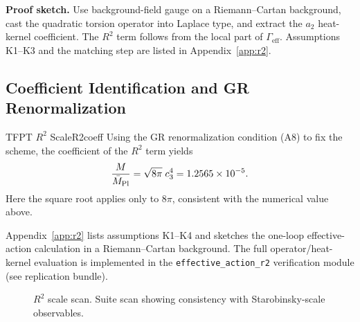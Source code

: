 \textbf{Proof sketch.} Use background-field gauge on a Riemann--Cartan background, cast the
quadratic torsion operator into Laplace type, and extract the $a_2$ heat-kernel coefficient.
The $R^2$ term follows from the local part of $\Gamma_{\mathrm{eff}}$. Assumptions K1--K3 and
the matching step are listed in Appendix~\ref{app:r2}.

\subsection{Coefficient Identification and GR Renormalization}

\begin{theorem}{TFPT $R^2$ Scale}{R2coeff}
Using the GR renormalization condition (A8) to fix the scheme, the coefficient of the
$R^2$ term yields
\begin{equation}
    \frac{M}{\bar{M}_{\mathrm{Pl}}}=\sqrt{8\pi}\;c_3^4
    = 1.2565\times 10^{-5}.
    \label{eq:R2scale}
\end{equation}
Here the square root applies only to $8\pi$, consistent with the numerical value above.
\end{theorem}

\begin{tcolorbox}[colback=green!3, colframe=green!50!black, 
    title={\textbf{Derivation Provided (Conditional)}}, fonttitle=\bfseries\small]
Appendix~\ref{app:r2} lists assumptions K1--K4 and sketches the one-loop effective-action
calculation in a Riemann--Cartan background. The full operator/heat-kernel evaluation is
implemented in the \texttt{effective\_action\_r2} verification module (see replication bundle).
\end{tcolorbox}

\begin{figure}[H]
\centering
{}
\caption{$R^2$ scale scan. Suite scan showing consistency with Starobinsky-scale observables.}
\label{fig:r2-scan}
\end{figure}

